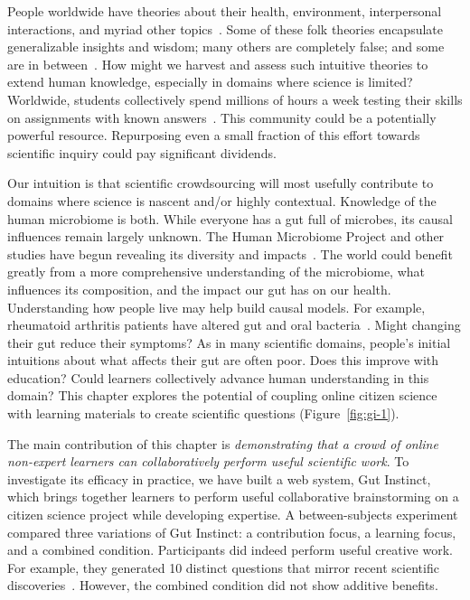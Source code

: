 People worldwide have theories about their health, environment, interpersonal interactions, and myriad other topics~\cite{Gelman2011}. Some of these folk theories encapsulate generalizable insights and wisdom; many others are completely false; and some are in between~\cite{Kempton1986}. How might we harvest and assess such intuitive theories to extend human knowledge, especially in domains where science is limited?  Worldwide, students collectively spend millions of hours a week testing their skills on assignments with known answers~\cite{Shah2015}. This community could be a potentially powerful resource. Repurposing even a small fraction of this effort towards scientific inquiry could pay significant dividends. 

Our intuition is that scientific crowdsourcing will most usefully contribute to domains where science is nascent and/or highly contextual. Knowledge of the human microbiome is both. While everyone has a gut full of microbes, its causal influences remain largely unknown. The Human Microbiome Project and other studies have begun revealing its diversity and impacts~\cite{Consortium2012, Consortium2013}. The world could benefit greatly from a more comprehensive understanding of the microbiome, what influences its composition, and the impact our gut has on our health. Understanding how people live may help build causal models. For example, rheumatoid arthritis patients have altered gut and oral bacteria~\cite{Zhang2015}. Might changing their gut reduce their symptoms? As in many scientific domains, people’s initial intuitions about what affects their gut are often poor. Does this improve with education? Could learners collectively advance human understanding in this domain? This chapter explores the potential of coupling online citizen science with learning materials to create scientific questions (Figure~\ref{fig:gi-1}). 

The main contribution of this chapter is \textit {demonstrating that a crowd of online non-expert learners can collaboratively perform useful scientific work}. To investigate its efficacy in practice, we have built a web system, Gut Instinct, which brings together learners to perform useful collaborative brainstorming on a citizen science project while developing expertise. A between-subjects experiment compared three variations of Gut Instinct: a contribution focus, a learning focus, and a combined condition. Participants did indeed perform useful creative work. For example, they generated 10 distinct questions that mirror recent scientific discoveries~\cite{KnightLab2016}. However, the combined condition did not show additive benefits. 

